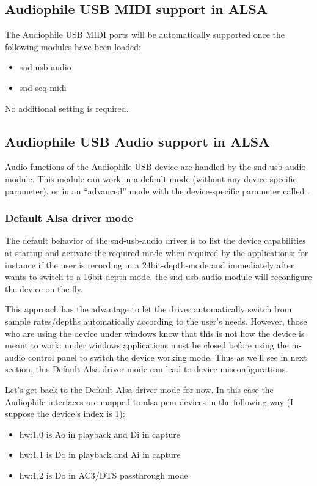 \documentclass[a4paper,8pt,english]{sphinxmanual}
\begin{document}
\subsection{Audiophile USB MIDI support in ALSA}
\label{sound/cards/audiophile-usb:audiophile-usb-midi-support-in-alsa}
The Audiophile USB MIDI ports will be automatically supported once the
following modules have been loaded:
\begin{itemize}
\item {} 
snd-usb-audio

\item {} 
snd-seq-midi

\end{itemize}

No additional setting is required.


\subsection{Audiophile USB Audio support in ALSA}
\label{sound/cards/audiophile-usb:audiophile-usb-audio-support-in-alsa}
Audio functions of the Audiophile USB device are handled by the snd-usb-audio
module. This module can work in a default mode (without any device-specific
parameter), or in an ``advanced'' mode with the device-specific parameter called
.


\subsubsection{Default Alsa driver mode}
\label{sound/cards/audiophile-usb:default-alsa-driver-mode}
The default behavior of the snd-usb-audio driver is to list the device
capabilities at startup and activate the required mode when required
by the applications: for instance if the user is recording in a
24bit-depth-mode and immediately after wants to switch to a 16bit-depth mode,
the snd-usb-audio module will reconfigure the device on the fly.

This approach has the advantage to let the driver automatically switch from sample
rates/depths automatically according to the user's needs. However, those who
are using the device under windows know that this is not how the device is meant to
work: under windows applications must be closed before using the m-audio control
panel to switch the device working mode. Thus as we'll see in next section, this
Default Alsa driver mode can lead to device misconfigurations.

Let's get back to the Default Alsa driver mode for now.  In this case the
Audiophile interfaces are mapped to alsa pcm devices in the following
way (I suppose the device's index is 1):
\begin{itemize}
\item {} 
hw:1,0 is Ao in playback and Di in capture

\item {} 
hw:1,1 is Do in playback and Ai in capture

\item {} 
hw:1,2 is Do in AC3/DTS passthrough mode

\end{itemize}
\end{document}
